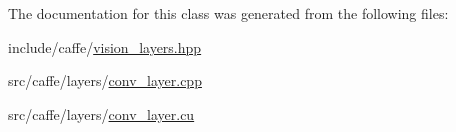 The documentation for this class was generated from the following files\+:\begin{DoxyCompactItemize}
\item 
include/caffe/\hyperlink{vision__layers_8hpp}{vision\+\_\+layers.\+hpp}\item 
src/caffe/layers/\hyperlink{conv__layer_8cpp}{conv\+\_\+layer.\+cpp}\item 
src/caffe/layers/\hyperlink{conv__layer_8cu}{conv\+\_\+layer.\+cu}\end{DoxyCompactItemize}
